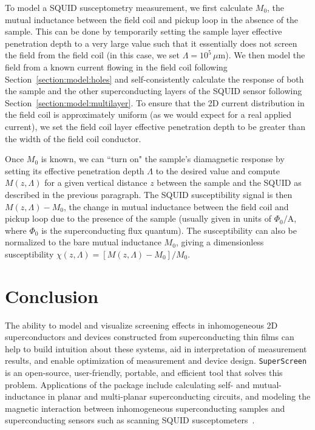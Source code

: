 \documentclass[final,3p,times]{elsarticle}
\newcommand{\inline}[1]{\texttt{#1}\xspace}
\newcommand{\SuperScreen}{\inline{SuperScreen}}
\begin{document}
To model a SQUID susceptometry measurement, we first calculate $M_0$, the mutual inductance between the field coil and pickup loop in the absence of the sample. This can be done by temporarily setting the sample layer effective penetration depth to a very large value such that it essentially does not screen the field from the field coil (in this case, we set $\Lambda = 10^5\,\mu\mathrm{m}$). We then model the field from a known current flowing in the field coil following Section~\ref{section:model:holes} and self-consistently calculate the response of both the sample and the other superconducting layers of the SQUID sensor following Section~\ref{section:model:multilayer}. To ensure that the 2D current distribution in the field coil is approximately uniform (as we would expect for a real applied current), we set the field coil layer effective penetration depth to be greater than the width of the field coil conductor.

Once $M_0$ is known, we can ``turn on" the sample's diamagnetic response by setting its effective penetration depth $\Lambda$ to the desired value and compute $M(z, \Lambda)$ for a given vertical distance $z$ between the sample and the SQUID as described in the previous paragraph. The SQUID susceptibility signal is then $M(z, \Lambda) - M_0$, the change in mutual inductance between the field coil and pickup loop due to the presence of the sample (usually given in units of $\Phi_0/\mathrm{A}$, where $\Phi_0$ is the superconducting flux quantum). The susceptibility can also be normalized to the bare mutual inductance $M_0$, giving a dimensionless susceptibility $\chi(z, \Lambda)=[M(z, \Lambda) - M_0] / M_0$.  


\section{Conclusion}
\label{section:conlusion}

The ability to model and visualize screening effects in inhomogeneous 2D superconductors and devices constructed from superconducting thin films can help to build intuition about these systems, aid in interpretation of measurement results, and enable optimization of measurement and device design. \SuperScreen is an open-source, user-friendly, portable, and efficient tool that solves this problem. Applications of the package include calculating self- and mutual-inductance in planar and multi-planar superconducting circuits, and modeling the magnetic interaction between inhomogeneous superconducting samples and superconducting sensors such as scanning SQUID susceptometers~\cite{Kirtley2016-zz}.
\end{document}

